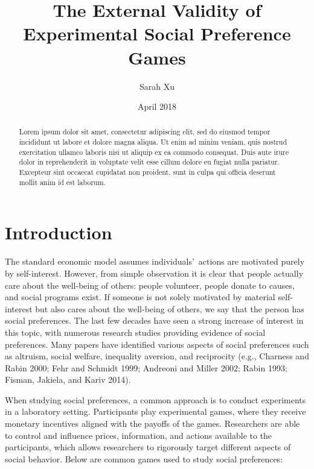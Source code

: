 \documentclass[12pt]{article}
\title{The External Validity of Experimental Social Preference Games}
\author{Sarah Xu}
\date{April 2018}
\begin{document}
\maketitle


\begin{abstract}
   Lorem ipsum dolor sit amet, consectetur adipiscing elit, sed do eiusmod tempor incididunt ut labore et dolore magna aliqua. Ut enim ad minim veniam, quis nostrud exercitation ullamco laboris nisi ut aliquip ex ea commodo consequat. Duis aute irure dolor in reprehenderit in voluptate velit esse cillum dolore eu fugiat nulla pariatur. Excepteur sint occaecat cupidatat non proident, sunt in culpa qui officia deserunt mollit anim id est laborum.
\end{abstract}

\section{Introduction}

The standard economic model assumes individuals\rq \ actions are motivated purely by self-interest. However, from simple observation it is clear that people actually care about the well-being of others: people volunteer, people donate to causes, and social programs exist. If someone is not solely motivated by material self-interest but also cares about the well-being of others, we say that the person has social preferences. The last few decades have seen a strong increase of interest in this topic, with numerous research studies providing evidence of social preferences. Many papers have identified various aspects of social preferences such as altruism, social welfare, inequality aversion, and reciprocity (e.g., Charness and Rabin 2000; Fehr and Schmidt 1999; Andreoni and Miller 2002; Rabin 1993; Fisman, Jakiela, and Kariv 2014). 
 
When studying social preferences, a common approach is to conduct experiments in a laboratory setting. Participants play experimental games, where they receive monetary incentives aligned with the payoffs of the games. Researchers are able to control and influence prices, information, and actions available to the participants, which allows researchers to rigorously target different aspects of social behavior. Below are common games used to study social preferences: 
\end{document}
